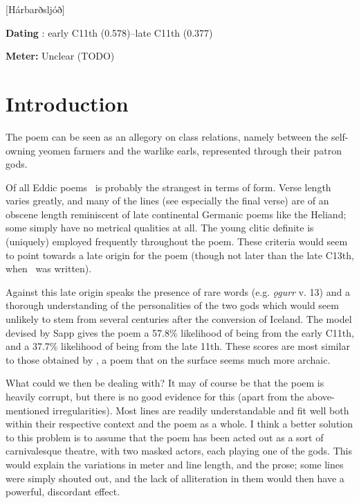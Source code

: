 [Hárbarðsljóð]

\begin{flushright}%
\textbf{Dating} \parencite{Sapp2022}: early C11th (0.578)–late C11th (0.377)

\textbf{Meter:} Unclear (TODO)%
\end{flushright}

\section{Introduction}

The poem can be seen as an allegory on class relations, namely between the self-owning yeomen farmers and the warlike earls, represented through their patron gods.

Of all Eddic poems \Harbardsljod\ is probably the strangest in terms of form. Verse length varies greatly, and many of the lines (see especially the final verse) are of an obscene length reminiscent of late continental Germanic poems like the Heliand; some simply have no metrical qualities at all. The young clitic definite is (uniquely) employed frequently throughout the poem. These criteria would seem to point towards a late origin for the poem (though not later than the late C13th, when \Regius\ was written).

Against this late origin speaks the presence of rare words (e.g. \emph{ǫgurr} v. 13) and a thorough understanding of the personalities of the two gods which would seem unlikely to stem from several centuries after the conversion of Iceland. The model devised by Sapp gives the poem a 57.8\% likelihood of being from the early C11th, and a 37.7\% likelihood of being from the late 11th. These scores are most similar to those obtained by \Gripisspa, a poem that on the surface seems much more archaic.

What could we then be dealing with? It may of course be that the poem is heavily corrupt, but there is no good evidence for this (apart from the above-mentioned irregularities). Most lines are readily understandable and fit well both within their respective context and the poem as a whole. I think a better solution to this problem is to assume that the poem has been acted out as a sort of carnivalesque theatre, with two masked actors, each playing one of the gods. This would explain the variations in meter and line length, and the prose; some lines were simply shouted out, and the lack of alliteration in them would then have a powerful, discordant effect.


